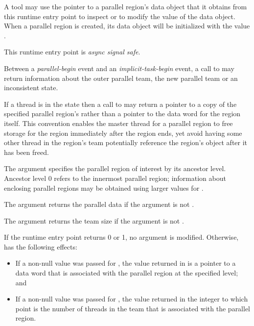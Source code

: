 A tool may use the pointer to a parallel region's data object that it
obtains from this runtime entry point to inspect or to modify the value
of the data object. When a parallel region is created, its data
object will be initialized with the value .

This runtime entry point is \emph{async signal safe}.

Between a \emph{parallel-begin} event and an \emph{implicit-task-begin} event, 
a call to  may return information about 
the outer parallel team, the new parallel team or an inconsistent state.

If a thread is in the state 
then a call to  may return a pointer to a copy 
of the specified parallel region's  rather than a pointer 
to the data word for the region itself. This convention enables the master 
thread for a parallel region to free storage for the region immediately after 
the region ends, yet avoid having some other thread in the region's team potentially 
reference the region's  object after it has been freed.

\argdesc
The  argument specifies the parallel region of 
interest by its ancestor level. Ancestor level 0 refers to the innermost 
parallel region; information about enclosing parallel regions may be 
obtained using larger values for .

The  argument returns the parallel data if the 
argument is not .

The  argument returns the team size if the argument 
is not .

\effect
If the runtime entry point returns 0 or 1, no argument is modified. 
Otherwise,  has the following effects:

\begin{itemize}
\item If a non-null value was passed for , the value 
      returned in  is a pointer to a data word that is
      associated with the parallel region at the specified level; and
\item If a non-null value was passed for , the value
      returned in the integer to which  point is the 
      number of threads in the team that is associated with the parallel region.
\end{itemize}

